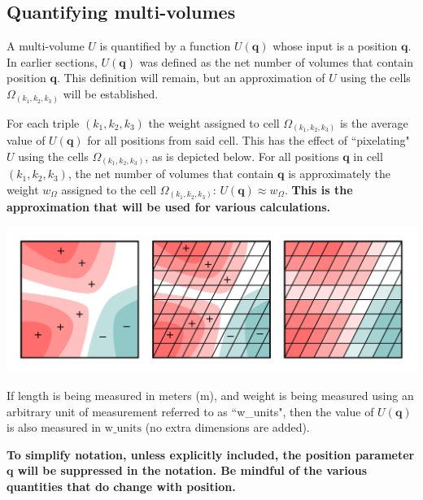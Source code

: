 \documentclass{book}
\begin{document}
\subsection*{Quantifying multi-volumes}

A multi-volume \(U\) is quantified by a function \(U(\mathbf{q})\) whose input is a position \(\mathbf{q}\). In earlier sections, \(U(\mathbf{q})\) was defined as the net number of volumes that contain position \(\mathbf{q}\). This definition will remain, but an approximation of \(U\) using the cells \(\Omega_{(k_1, k_2, k_3)}\) will be established. 

For each triple \((k_1, k_2, k_3)\) the weight assigned to cell \(\Omega_{(k_1, k_2, k_3)}\) is the average value of \(U(\mathbf{q})\) for all positions from said cell. This has the effect of ``pixelating" \(U\) using the cells \(\Omega_{(k_1, k_2, k_3)}\), as is depicted below. For all positions \(\mathbf{q}\) in cell \((k_1, k_2, k_3)\), the net number of volumes that contain \(\mathbf{q}\) is approximately the weight \(w_{\Omega}\) assigned to the cell \(\Omega_{(k_1, k_2, k_3)}\): \(U(\mathbf{q}) \approx w_{\Omega}\). {\bf This is the approximation that will be used for various calculations.} 

\begin{center}
\includegraphics[width = \textwidth]{Coordinate_systems/volume_pixelation}
\end{center}

If length is being measured in meters (m), and weight is being measured using an arbitrary unit of measurement referred to as ``w\_units", then the value of \(U(\mathbf{q})\) is also measured in \(\text{w\_units}\) (no extra dimensions are added).

\vspace{5mm}

{\bf To simplify notation, unless explicitly included, the position parameter \(\mathbf{q}\) will be suppressed in the notation. Be mindful of the various quantities that do change with position.}
\end{document}
